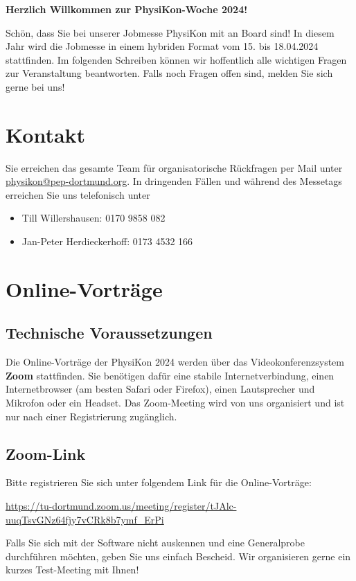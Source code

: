 \documentclass[
  paper=a4,
  fontsize=12pt,
  DIV=16,
  headheight=30pt,
  footheight=45pt,
  headinclude,
  parskip=half,
]{scrartcl}
\begin{document}
\textbf{\Large Herzlich Willkommen zur PhysiKon-Woche 2024!}

\vspace{1cm}
Schön, dass Sie bei unserer Jobmesse PhysiKon mit an Board sind!
In diesem Jahr wird die Jobmesse in einem hybriden Format vom 15. bis 18.04.2024 stattfinden.
Im folgenden Schreiben können wir hoffentlich alle wichtigen Fragen zur Veranstaltung beantworten.
Falls noch Fragen offen sind, melden Sie sich gerne bei uns!

\section*{Kontakt}

Sie erreichen das gesamte Team für organisatorische Rückfragen per Mail unter \href{mailto:physikon@pep-dortmund.org}{physikon@pep-dortmund.org}.
In dringenden Fällen und während des Messetags erreichen Sie uns telefonisch unter
\begin{itemize}
  \item Till Willershausen: 0170 9858 082
  \item Jan-Peter Herdieckerhoff: 0173 4532 166
\end{itemize}

\section*{Online-Vorträge}
\subsection*{Technische Voraussetzungen}

Die Online-Vorträge der PhysiKon 2024 werden über das Videokonferenzsystem \textbf{Zoom} stattfinden.
Sie benötigen dafür eine stabile Internetverbindung, einen Internetbrowser (am besten Safari oder Firefox), einen Lautsprecher und Mikrofon oder ein Headset.
Das Zoom-Meeting wird von uns organisiert und ist nur nach einer Registrierung zugänglich.

\subsection*{Zoom-Link}
Bitte registrieren Sie sich unter folgendem Link für die Online-Vorträge:

\url{https://tu-dortmund.zoom.us/meeting/register/tJAlc-uuqTsvGNz64fjy7vCRk8b7ymf_ErPi}

Falls Sie sich mit der Software nicht auskennen und eine Generalprobe durchführen möchten, geben Sie uns einfach Bescheid.
Wir organisieren gerne ein kurzes Test-Meeting mit Ihnen!
\end{document}
